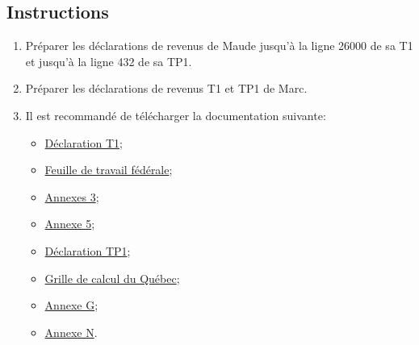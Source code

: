 \subsection{Instructions}
\begin{enumerate}
	\item Préparer les déclarations de revenus de Maude jusqu'à la ligne 26000 de sa T1 et jusqu'à la ligne 432 de sa TP1.
	\item Préparer les déclarations de revenus T1 et TP1 de Marc.
	\item Il est recommandé de télécharger la documentation suivante:
	\begin{itemize}
		\item \href{https://www.canada.ca/fr/agence-revenu/services/formulaires-publications/trousses-impot-toutes-annees-imposition/trousse-generale-impot-prestations/quebec/5005-r.html}{Déclaration T1};
		\item \href{https://www.canada.ca/fr/agence-revenu/services/formulaires-publications/trousses-impot-toutes-annees-imposition/trousse-generale-impot-prestations/5000-d1.html}{Feuille de travail fédérale};
		\item \href{https://www.canada.ca/fr/agence-revenu/services/formulaires-publications/trousses-impot-toutes-annees-imposition/trousse-generale-impot-prestations/5000-s3.html}{Annexes 3};
		\item \href{https://www.canada.ca/fr/agence-revenu/services/formulaires-publications/trousses-impot-toutes-annees-imposition/trousse-generale-impot-prestations/5000-s5.html}{Annexe 5};
		\item \href{https://www.revenuquebec.ca/documents/fr/formulaires/tp/2023-12/TP-1.D%282023-12%29.pdf}{Déclaration TP1};
		\item \href{https://www.revenuquebec.ca/documents/fr/formulaires/tp/2023-12/TP-1.D.GR%282023-12%29.pdf}{Grille de calcul du Québec};
		\item \href{https://www.revenuquebec.ca/documents/fr/formulaires/tp/2023-12/TP-1.D.G%282023-12%29.pdf}{Annexe G};
		\item \href{https://www.revenuquebec.ca/documents/fr/formulaires/tp/2023-12/TP-1.D.N%282023-12%29.pdf}{Annexe N}.
	\end{itemize}
\end{enumerate}

